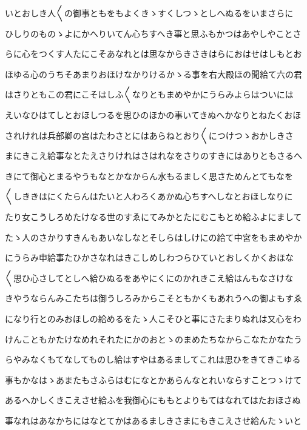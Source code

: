 \documentclass[a4paper,11pt,landscape]{ltjtarticle}
\begin{document}
\par\medskip
いとおしき人〱の御事ともをもよくきゝすくしつゝとしへぬるをいまさらに
\par\medskip
ひしりのものゝよにかへりいてん心ちすへき事と思ふもかつはあやしやことさ
\par\medskip
らに心をつくす人たにこそあなれとは思なからきさきはらにおはせはしもとお
\par\medskip
ほゆる心のうちそあまりおほけなかりけるかゝる事を右大殿ほの聞給て六の君
\par\medskip
はさりともこの君にこそはしふ〱なりともまめやかにうらみよらはついには
\par\medskip
えいなひはてしとおほしつるを思ひのほかの事いてきぬへかなりとねたくおほ
\par\medskip
されけれは兵部卿の宮はたわさとにはあらねとおり〱につけつゝおかしきさ
\par\medskip
まにきこえ給事なとたえさりけれはさはれなをさりのすきにはありともさるへ
\par\medskip
きにて御心とまるやうもなとかなからん水もるましく思さためんとてもなを
\par\medskip
〱しききはにくたらんはたいと人わろくあかぬ心ちすへしなとおほしなりに
\par\medskip
たり女こうしろめたけなる世のすゑにてみかとたにむこもとめ給ふよにまして
\par\medskip
たゝ人のさかりすきんもあいなしなとそしらはしけにの給て中宮をもまめやか
\par\medskip
にうらみ申給事たひかさなれはきこしめしわつらひていとおしくかくおほな
\par\medskip
〱思ひ心さしてとしへ給ひぬるをあやにくにのかれきこえ給はんもなさけな
\par\medskip
きやうならんみこたちは御うしろみからこそともかくもあれうへの御よもすゑ
\par\medskip
になり行とのみおほしの給めるをたゝ人こそひと事にさたまりぬれは又心をわ
\par\medskip
けんこともかたけなめれそれたにかのおとゝのまめたちなからこなたかなたう
\par\medskip
らやみなくもてなしてものし給はすやはあるましてこれは思ひをきてきこゆる
\par\medskip
事もかなはゝあまたもさふらはむになとかあらんなとれいならすことつゝけて
\par\medskip
あるへかしくきこえさせ給ふを我御心にももとよりもてはなれてはたおほさぬ
\par\medskip
事なれはあなかちにはなとてかはあるましきさまにもきこえさせ給んたゝいと
\par\medskip
\end{document}

